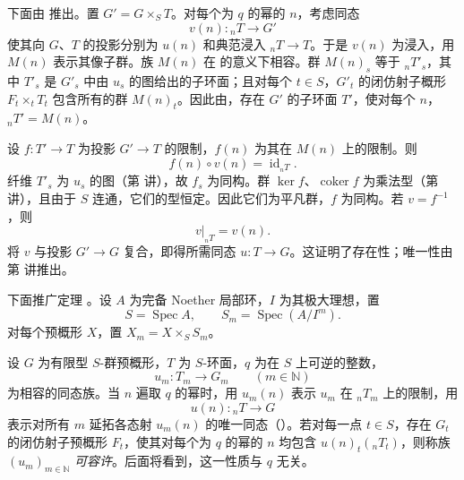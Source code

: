 下面由 推出。置 \(G'=G\times_S T\)。对每个为 \(q\) 的幂的 \(n\)，考虑同态
\[
  v(n):{}_nT\longrightarrow G'
\]
使其向 \(G\)、\(T\) 的投影分别为 \(u(n)\) 和典范浸入 \({}_nT\to T\)。于是 \(v(n)\) 为浸入，用 \(M(n)\) 表示其像子群。族 \(M(n)\) 在 的意义下相容。群 \(M(n)_s\) 等于 \({}_nT'_s\)，其中 \(T'_s\) 是 \(G'_s\) 中由 \(u_s\) 的图给出的子环面；且对每个 \(t\in S\)，\(G'_t\) 的闭仿射子概形 \(F_t\times_tT_t\) 包含所有的群 \(M(n)_t\)。因此由，存在 \(G'\) 的子环面 \(T'\)，使对每个 \(n\)，\({}_nT'=M(n)\)。

设 \(f:T'\to T\) 为投影 \(G'\to T\) 的限制，\(f(n)\) 为其在 \(M(n)\) 上的限制。则
\[
  f(n)\circ v(n)=\operatorname{id}_{{}_nT}.
\]
纤维 \(T'_s\) 为 \(u_s\) 的图（第  讲），故 \(f_s\) 为同构。群 \(\ker f\)、\(\operatorname{coker}f\) 为乘法型（第  讲），且由于 \(S\) 连通，它们的型恒定。因此它们为平凡群，\(f\) 为同构。若 \(v=f^{-1}\)，则
\[
  v|_{{}_nT}=v(n).
\]
将 \(v\) 与投影 \(G'\to G\) 复合，即得所需同态 \(u:T\to G\)。这证明了存在性；唯一性由第  讲推出。


下面推广定理 。设 \(A\) 为完备 Noether 局部环，\(I\) 为其极大理想，置
\[
  S=\operatorname{Spec}A,\qquad
  S_m=\operatorname{Spec}(A/I^m).
\]
对每个预概形 \(X\)，置 \(X_m=X\times_SS_m\)。

设 \(G\) 为有限型 \(S\)-群预概形，\(T\) 为 \(S\)-环面，\(q\) 为在 \(S\) 上可逆的整数，
\[
  u_m:T_m\longrightarrow G_m\qquad(m\in\mathbb N)
\]
为相容的同态族。当 \(n\) 遍取 \(q\) 的幂时，用 \(u_m(n)\) 表示 \(u_m\) 在 \({}_nT_m\) 上的限制，用
\[
  u(n):{}_nT\longrightarrow G
\]
表示对所有 \(m\) 延拓各态射 \(u_m(n)\) 的唯一同态（）。若对每一点 \(t\in S\)，存在 \(G_t\) 的闭仿射子预概形 \(F_t\)，使其对每个为 \(q\) 的幂的 \(n\) 均包含 \(u(n)_t({}_nT_t)\)，则称族 \((u_m)_{m\in\mathbb N}\) \emph{可容许}。后面将看到，这一性质与 \(q\) 无关。



